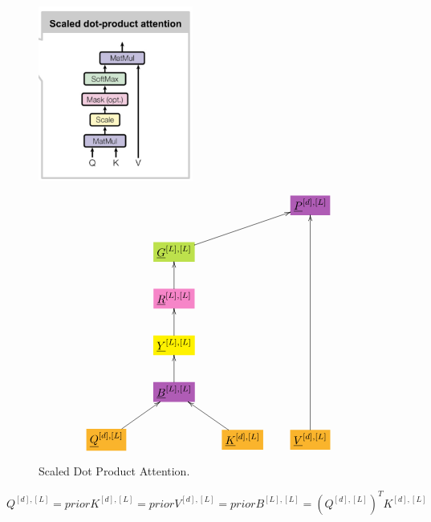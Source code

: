 \documentclass[12pt]{article}
\begin{document}
\begin{figure}[h!]\centering
\begin{minipage}{.5\linewidth}
\includegraphics[width=2in]{scaled-dot-prod-att.jpg}
\end{minipage}%
\begin{minipage}{.5\linewidth}
$$\xymatrix{
&&&*+[F*:Orchid]{\underline{P}^{[d], [L]}}
\\
&*+[F*:SpringGreen]{\underline{G}^{[L], [L]}}\ar[urr]&&
\\
&*+[F*:Lavender]{\underline{R}^{[L], [L]}}\ar[u]&&
\\
&*+[F*:yellow]{\underline{Y}^{[L],[L]}}\ar[u]&&
\\
&*+[F*:Orchid]{\underline{B}^{[L], [L]}}\ar[u]&&
\\
*+[F*:Dandelion]{\underline{Q}^{[d],[L]}}\ar[ur]&&*+[F*:Dandelion]{\underline{K}^{[d],[L]}}\ar[ul]&*+[F*:Dandelion]{\underline{V}^{[d],[L]}}\ar[uuuuu]
}$$
\end{minipage}
\caption{Scaled Dot Product Attention.}
\label{fig-texnn-for-scaled-dot-prod-att}
\end{figure}\begin{subequations}
\begin{equation}
Q^{[d],[L]} = prior
\label{eq-Q-fun-scaled-dot-prod-att}
\end{equation}

\begin{equation}
K^{[d],[L]} = prior
\label{eq-K-fun-scaled-dot-prod-att}
\end{equation}

\begin{equation}
V^{[d],[L]} = prior
\label{eq-V-fun-scaled-dot-prod-att}
\end{equation}

\begin{equation}
B^{[L], [L]} = (Q^{[d],[L]})^T K^{[d],[L]}
\label{eq-B-fun-scaled-dot-prod-att}
\end{equation}


\end{subequations}
\end{document}
